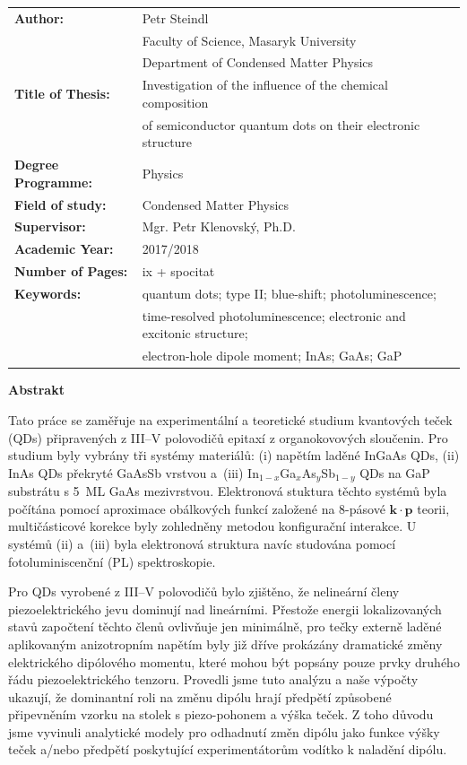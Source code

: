 \documentclass[
a4paper, %
11pt, %
onecolumn, %
openany, %
oldfontcommands,
]{memoir}
\begin{document}
\normalsize
\begin{tabular}{ll}
	\textbf{Author:} & Petr Steindl \\[-0.5cm]
	& Faculty of Science, Masaryk University \\[-0.5cm]
	& Department of Condensed Matter Physics \\[-0.5cm]
	\textbf{Title of Thesis:} &  Investigation of the influence of the chemical composition \\[-0.5cm]
	& of semiconductor quantum dots on their electronic structure\\
	\textbf{Degree Programme:}& Physics \\
	\textbf{Field of study:}& Condensed Matter Physics \\
	\textbf{Supervisor:}& Mgr. Petr Klenovský, Ph.D. \\
	\textbf{Academic Year:}& 2017/2018 \\
	\textbf{Number of Pages:}& ix + spocitat \\
	\textbf{Keywords:}& quantum dots; type II; blue-shift; photoluminescence; \\[-0.5cm]
	&time-resolved photoluminescence; electronic and excitonic structure;\\[-0.5cm]
	& electron-hole dipole moment; InAs; GaAs; GaP \\
\end{tabular}
\renewcommand{\arraystretch}{1} 
\newpage

\cleardoublepage

\noindent\Large\textbf{Abstrakt}\\ \normalsize

\noindent Tato práce se zaměřuje na experimentální a teoretické studium kvantových teček (QDs) připrave\-ných z III--V polovodičů epitaxí z organokovových sloučenin. Pro studium byly vybrány tři systémy materiálů: (i) napětím laděné InGaAs QDs, (ii) InAs QDs překryté GaAsSb vrstvou a~(iii) In$_{1-x}$Ga$_x$As$_y$Sb$_{1-y}$ QDs na GaP substrátu s 5~ML GaAs mezivrstvou. Elektronová stuktura těchto systémů byla počítána pomocí aproximace obálkových funkcí založené na 8-pásové $\mathbf{k\cdot p}$ teorii, multičásticové korekce byly zohledněny metodou konfigurační interakce. U systémů (ii) a~(iii) byla elektronová struktura navíc studována pomocí fotoluminiscenční (PL) spektroskopie. 

Pro QDs vyrobené z III--V polovodičů bylo zjištěno, že nelineární členy piezoelektrického jevu dominují nad lineárními. Přestože energii lokalizovaných stavů započtení těchto členů ovlivňuje jen minimálně, pro tečky externě laděné aplikovaným anizotropním napětím byly již dříve prokázány dramatické změny elektrického dipólového momentu, které mohou být popsány pouze prvky druhého řádu piezoelektrického tenzoru. Provedli jsme tuto analýzu a naše výpočty ukazují, že dominantní roli na změnu dipólu hrají předpětí způsobené připevněním vzorku na stolek s piezo-pohonem a výška teček. Z toho důvodu jsme vyvinuli analytické modely pro odhadnutí změn dipólu jako funkce výšky teček a/nebo předpětí poskytující experimentátorům vodítko k naladění dipólu.
\end{document}
